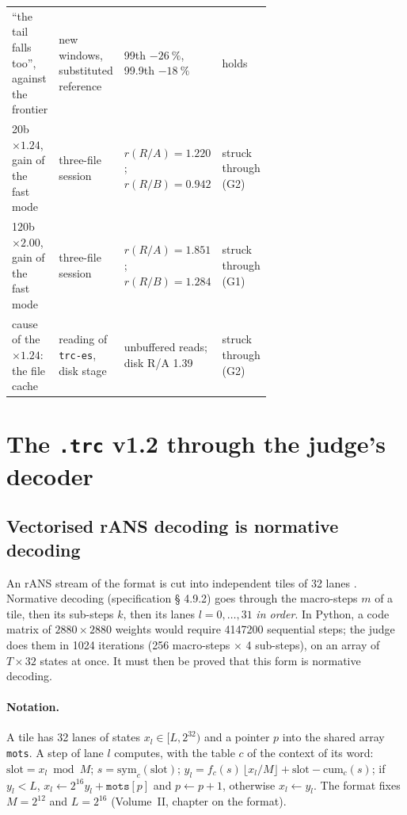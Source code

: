 \begin{table}[ht]
\begin{tabularx}{\linewidth}{@{}>{\raggedright\arraybackslash}p{0.28\linewidth}>{\raggedright\arraybackslash}X>{\raggedright\arraybackslash}p{0.24\linewidth}>{\raggedright\arraybackslash}p{0.13\linewidth}@{}}
``the tail falls too'', against the frontier & new windows, substituted reference & 99th $-\SI{26}{\percent}$, 99.9th $-\SI{18}{\percent}$ & holds \\
20b $\times 1.24$, gain of the fast mode & three-file session & $r(R/A) = \num{1.220}$; $r(R/B) = \num{0.942}$ & struck through (G2) \\
120b $\times 2.00$, gain of the fast mode & three-file session & $r(R/A) = \num{1.851}$; $r(R/B) = \num{1.284}$ & struck through (G1) \\
cause of the $\times 1.24$: the file cache & reading of \texttt{trc-es}, disk stage & unbuffered reads; disk R/A \num{1.39} & struck through (G2) \\
\bottomrule
\end{tabularx}
\end{table}

\section{The \texttt{.trc} v1.2 through the judge's decoder}\label{t3jug:sec:jt}

\subsection{Vectorised rANS decoding is normative decoding}\label{t3jug:sec:vectorise}

An rANS stream of the format is cut into independent tiles of 32 lanes \parencite{duda2013ans,giesen2014interleaved}. Normative decoding (specification § 4.9.2) goes through the macro-steps $m$ of a tile, then its sub-steps $k$, then its lanes $l = 0, \dots, 31$ \emph{in order}. In Python, a code matrix of $\num{2880} \times \num{2880}$ weights would require \num{4147200} sequential steps; the judge does them in \num{1024} iterations (256 macro-steps $\times$ 4 sub-steps), on an array of $T \times 32$ states at once. It must then be proved that this form is normative decoding.

\paragraph{Notation.} A tile has 32 lanes of states $x_l \in [L, 2^{32})$ and a pointer $p$ into the shared array \texttt{mots}. A step of lane $l$ computes, with the table $c$ of the context of its word: $\text{slot} = x_l \bmod M$; $s = \mathrm{sym}_c(\text{slot})$; $y_l = f_c(s)\,\lfloor x_l / M\rfloor + \text{slot} - \mathrm{cum}_c(s)$; if $y_l < L$, $x_l \leftarrow 2^{16} y_l + \texttt{mots}[p]$ and $p \leftarrow p + 1$, otherwise $x_l \leftarrow y_l$. The format fixes $M = 2^{12}$ and $L = 2^{16}$ (Volume~II, chapter on the format).

